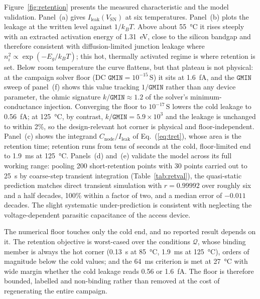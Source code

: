 \documentclass[11pt,a4paper]{article}
\newcommand{\Vsn}{V_{\mathrm{SN}}}
\newcommand{\Ileak}{I_{\mathrm{leak}}}
\newcommand{\Cnode}{C_{\mathrm{node}}}
\begin{document}
Figure~\ref{fig:retention} presents the measured characteristic and the model
validation. Panel~(a) gives $\Ileak(\Vsn)$ at six temperatures. Panel~(b) plots
the leakage at the written level against $1/k_BT$. Above about \SI{55}{\celsius}
it rises steeply with an extracted activation energy of \SI{1.31}{\electronvolt},
close to the silicon bandgap and therefore consistent with diffusion-limited
junction leakage where $n_i^2\propto\exp(-E_g/k_BT)$; this hot, thermally
activated regime is where retention is set. Below room temperature the curve
flattens, but that plateau is not physical: at the campaign solver floor
(DC $\texttt{GMIN}=10^{-15}\,\mathrm{S}$) it sits at \SI{1.6}{\femto\ampere}, and
the $\texttt{GMIN}$ sweep of panel~(f) shows this value tracking $1/\texttt{GMIN}$
rather than any device parameter, the ohmic signature $k/\texttt{GMIN}\approx1.2$
of the solver's minimum-conductance injection. Converging the floor to
$10^{-17}\,\mathrm{S}$ lowers the cold leakage to \SI{0.56}{\femto\ampere}; at
\SI{125}{\celsius}, by contrast, $k/\texttt{GMIN}=5.9\times10^{3}$ and the leakage
is unchanged to within 2\%, so the design-relevant hot corner is physical and
floor-independent. Panel~(c) shows the integrand $\Cnode/\Ileak$ of
Eq.~(\ref{eq:tret}), whose area is the retention time; retention runs from tens of
seconds at the cold, floor-limited end to \SI{1.9}{\milli\second} at
\SI{125}{\celsius}. Panels~(d) and~(e) validate the model across its full working
range: pooling 200 short-retention points with 30 points carried out to
\SI{25}{\second} by coarse-step transient integration (Table~\ref{tab:retval}),
the quasi-static prediction matches direct transient simulation with $r=0.99992$
over roughly six and a half decades, 100\% within a factor of two, and a median
error of $-0.011$ decades. The slight systematic under-prediction is consistent
with neglecting the voltage-dependent parasitic capacitance of the access device.

The numerical floor touches only the cold end, and no reported result depends on
it. The retention objective is worst-cased over the conditions $\mathcal{Q}$,
whose binding member is always the hot corner (\SI{0.13}{\second} at
\SI{85}{\celsius}, \SI{1.9}{\milli\second} at \SI{125}{\celsius}), orders of
magnitude below the cold values; and the \SI{64}{\milli\second} criterion is met
at \SI{27}{\celsius} with wide margin whether the cold leakage reads \num{0.56} or
\SI{1.6}{\femto\ampere}. The floor is therefore bounded, labelled and non-binding
rather than removed at the cost of regenerating the entire campaign.
\end{document}
